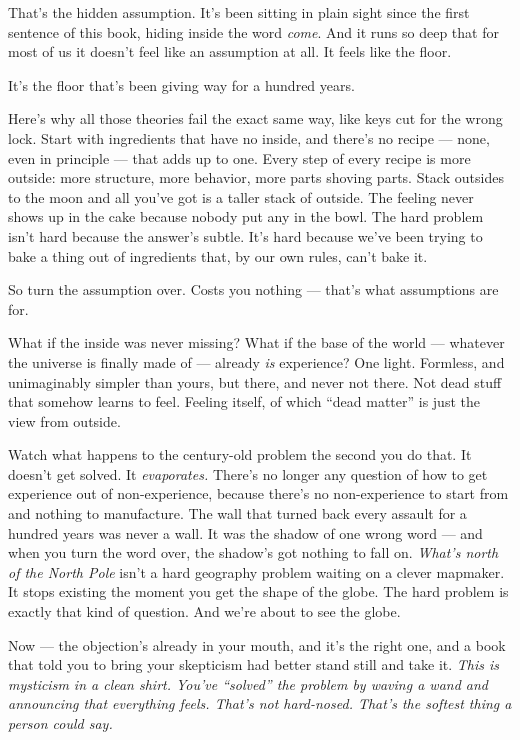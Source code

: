 \documentclass[11pt,openany]{book}
\begin{document}
That’s the hidden assumption. It’s been sitting in plain sight since the first sentence of this book, hiding inside the word \textit{come}. And it runs so deep that for most of us it doesn’t feel like an assumption at all. It feels like the floor.

It’s the floor that’s been giving way for a hundred years.

Here’s why all those theories fail the exact same way, like keys cut for the wrong lock. Start with ingredients that have no inside, and there’s no recipe — none, even in principle — that adds up to one. Every step of every recipe is more outside: more structure, more behavior, more parts shoving parts. Stack outsides to the moon and all you’ve got is a taller stack of outside. The feeling never shows up in the cake because nobody put any in the bowl. The hard problem isn’t hard because the answer’s subtle. It’s hard because we’ve been trying to bake a thing out of ingredients that, by our own rules, can’t bake it.

So turn the assumption over. Costs you nothing — that’s what assumptions are for.

What if the inside was never missing? What if the base of the world — whatever the universe is finally made of — already \textit{is} experience? One light. Formless, and unimaginably simpler than yours, but there, and never not there. Not dead stuff that somehow learns to feel. Feeling itself, of which “dead matter” is just the view from outside.

Watch what happens to the century-old problem the second you do that. It doesn’t get solved. It \textit{evaporates.} There’s no longer any question of how to get experience out of non-experience, because there’s no non-experience to start from and nothing to manufacture. The wall that turned back every assault for a hundred years was never a wall. It was the shadow of one wrong word — and when you turn the word over, the shadow’s got nothing to fall on. \textit{What’s north of the North Pole} isn’t a hard geography problem waiting on a clever mapmaker. It stops existing the moment you get the shape of the globe. The hard problem is exactly that kind of question. And we’re about to see the globe.

Now — the objection’s already in your mouth, and it’s the right one, and a book that told you to bring your skepticism had better stand still and take it. \textit{This is mysticism in a clean shirt. You’ve “solved” the problem by waving a wand and announcing that everything feels. That’s not hard-nosed. That’s the softest thing a person could say.}
\end{document}
